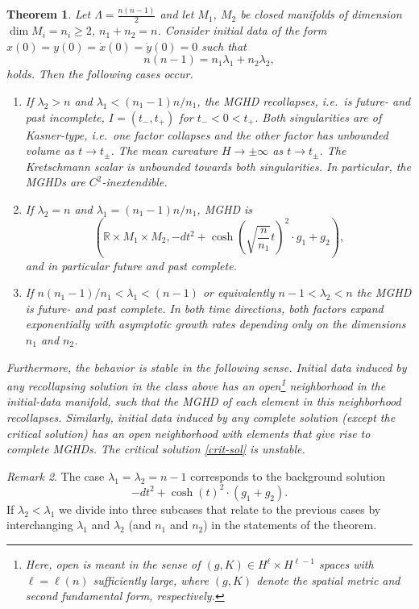 \documentclass[a4paper,10pt]{article}
\theoremstyle{plain}
\newtheorem{thm}{Theorem}[section]
\theoremstyle{definition}
\theoremstyle{remark}
\newtheorem{rem}[thm]{Remark}
\theoremstyle{plain}
\newcommand{\eq}[1]{\begin{equation}#1\end{equation}}
\newcommand{\la}{\lambda}
\numberwithin{equation}{section}
\begin{document}
\begin{thm}\label{thm-1}
Let $\Lambda=\frac{n(n-1)}{2}$ and let $M_1$, $M_2$ be closed manifolds of  dimension $\dim M_i=n_i\geq 2$, $n_1+n_2=n$. Consider initial data of the form $x(0)=y(0)=\dot x(0)=\dot y(0)=0$ such that
\eq{\label{eq-def-rel}
n(n-1)=n_1\la_1+n_2\la_2,
}
holds. Then the following cases occur.
\begin{enumerate}

\item If $\la_2>n$ and $\la_1<(n_1-1)n/n_1$, the MGHD recollapses, i.e.~is future- and past incomplete, $I=(t_-,t_+)$ for $t_-<0<t_+$. Both singularities are of Kasner-type, i.e.~one factor collapses and the other factor has unbounded volume as $t\rightarrow t_{\pm}$. The mean curvature $H\rightarrow \pm\infty$ as $t\rightarrow t_{\pm}$. The Kretschmann scalar is unbounded towards both singularities. In particular, the MGHDs are $C^2$-inextendible.

\item If $\la_2=n$ and $\la_1=(n_1-1)n/n_1$, MGHD is 
\eq{\label{crit-sol}
\left(\mathbb R\times M_1\times M_2,-dt^2+\cosh\left(\sqrt{\frac{n}{n_1}}t\right)^2\cdot g_1 + g_2\right),
}
and in particular future and past complete.
\item If $n(n_1-1)/n_1<\la_1<(n-1)$ or equivalently $n-1<\la_2<n$ the MGHD is future- and past complete. In both time directions, both factors expand exponentially with asymptotic growth rates depending only on the dimensions $n_1$ and $n_2$. 
\end{enumerate}
Furthermore, the behavior is stable in the following sense. Initial data induced by any recollapsing solution in the class above has an open\footnote{Here, open is meant in the sense of $(g,K)\in H^\ell\times H^{\ell-1}$ spaces with $\ell=\ell(n)$ sufficiently large, where $(g,K)$ denote the spatial metric and second fundamental form, respectively.} neighborhood in the initial-data manifold, such that the MGHD of each element in this neighborhood recollapses. Similarly, initial data induced by any complete solution (except the critical solution) has an open neighborhood with elements that give rise to complete MGHDs. The critical solution \eqref{crit-sol} is unstable. 
\end{thm}
%
\begin{rem}
The case $\la_1=\la_2=n-1$ corresponds to the background solution
\eq{
-dt^2+ \cosh(t)^2 \cdot (g_1+g_2).
} 
If $\la_2<\la_1$ we divide into three subcases that relate to the previous cases by interchanging $\la_1$ and $\la_2$ (and $n_1$ and $n_2$) in the statements of the theorem.
\end{rem}
\end{document}
